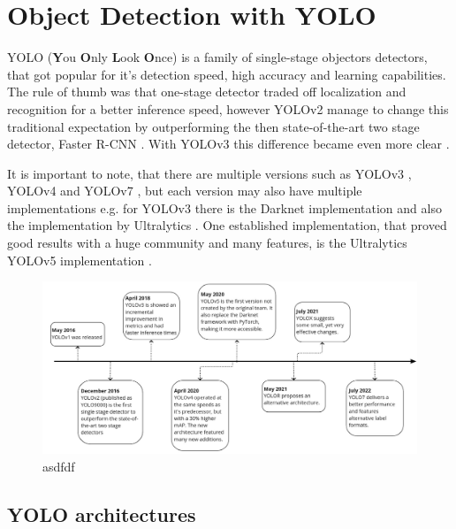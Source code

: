 \section{Object Detection with YOLO}
YOLO (\textbf{Y}ou \textbf{O}nly \textbf{L}ook \textbf{O}nce) is a family of single-stage objectors detectors, that got popular for it's detection speed, high accuracy and learning capabilities. The rule of thumb was that one-stage detector traded off localization and recognition for a better inference speed, however YOLOv2 manage to change this traditional expectation by outperforming the then state-of-the-art two stage detector, Faster R-CNN \cite{yolov2_paper}. With YOLOv3 this difference became even more clear \cite{yolov3_vs}.

It is important to note, that there are multiple versions such as
YOLOv3 \cite{yolov3_paper}, YOLOv4 \cite{yolov4_paper} and YOLOv7 \cite{yolov7_paper}, but each version may also have multiple implementations e.g. for YOLOv3 there is the Darknet implementation \cite{darknet_git} and also the implementation by Ultralytics \cite{yolov3_ultralytics_git}. One established implementation, that proved good results with a huge community and many features, is the Ultralytics YOLOv5 implementation \cite{yolov5_git}.

\begin{figure}[!h]
  \centering
  \captionsetup{justification=centering,margin=2cm}
  \includegraphics[width=\columnwidth]{images/detection/timeline}
  \caption{asdfdf}
  \label{sdfdfd}
\end{figure}


\subsection{YOLO architectures}

